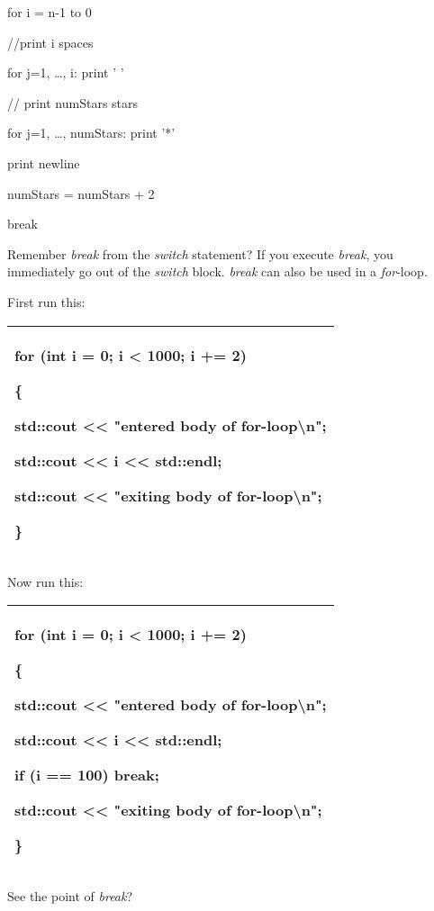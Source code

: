 \documentclass[
]{article}
\begin{document}
for i = n-1 to 0

//print i spaces

for j=1, \ldots, i: print ' '

// print numStars stars

for j=1, \ldots, numStars: print '*'

print newline

numStars = numStars + 2

break

Remember \emph{break} from the \emph{switch} statement? If you execute
\emph{break}, you immediately go out of the \emph{switch} block.
\emph{break} can also be used in a \emph{for}-loop.

First run this:

\begin{longtable}[]{@{}l@{}}
\toprule
\endhead
\begin{minipage}[t]{0.97\columnwidth}\raggedright
for (int i = 0; i \textless{} 1000; i += 2)

\{

std::cout \textless\textless{} "entered body of
for-loop\textbackslash n";

std::cout \textless\textless{} i \textless\textless{} std::endl;

std::cout \textless\textless{} "exiting body of
for-loop\textbackslash n";

\}\strut
\end{minipage}\tabularnewline
\bottomrule
\end{longtable}

Now run this:

\begin{longtable}[]{@{}l@{}}
\toprule
\endhead
\begin{minipage}[t]{0.97\columnwidth}\raggedright
for (int i = 0; i \textless{} 1000; i += 2)

\{

std::cout \textless\textless{} "entered body of
for-loop\textbackslash n";

std::cout \textless\textless{} i \textless\textless{} std::endl;

\textbf{if (i == 100) break;}

std::cout \textless\textless{} "exiting body of
for-loop\textbackslash n";

\}\strut
\end{minipage}\tabularnewline
\bottomrule
\end{longtable}

See the point of \emph{break}?
\end{document}
